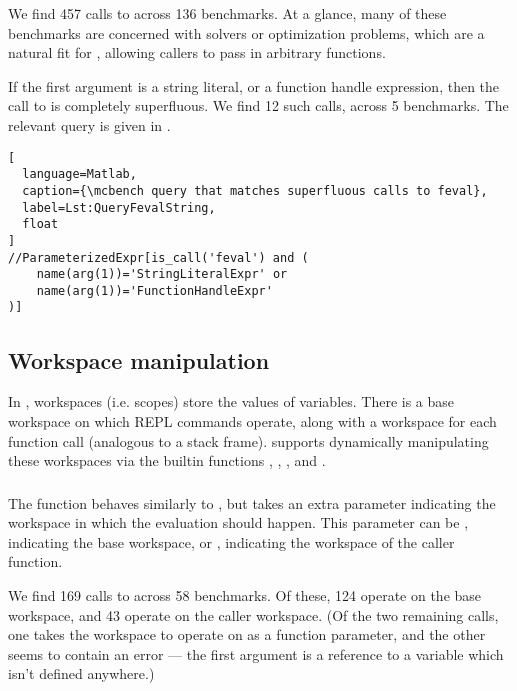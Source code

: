 We find 457 calls to  across 136 benchmarks. At a glance, many of
these benchmarks are concerned with solvers or optimization problems, which are
a natural fit for , allowing callers to pass in arbitrary
functions.

If the first argument is a string literal, or a function handle expression,
then the call to  is completely superfluous. We find 12 such calls,
across 5 benchmarks. The relevant query is given in
.

\begin{lstlisting}[
  language=Matlab,
  caption={\mcbench query that matches superfluous calls to feval},
  label=Lst:QueryFevalString,
  float
]
//ParameterizedExpr[is_call('feval') and (
    name(arg(1))='StringLiteralExpr' or
    name(arg(1))='FunctionHandleExpr'
)]
\end{lstlisting}

\subsection{Workspace manipulation}

In \matlab, workspaces (i.e. scopes) store the values of variables. There is a
base workspace on which REPL commands operate, along with a workspace for each
function call (analogous to a stack frame). \matlab supports dynamically
manipulating these workspaces via the builtin functions ,
, , and .

\subsubsection{}

The  function behaves similarly to , but takes an extra
parameter indicating the workspace in which the evaluation should happen. This
parameter can be , indicating the \matlab base workspace, or
, indicating the workspace of the caller function.

We find 169 calls to  across 58 benchmarks. Of these, 124 operate
on the base workspace, and 43 operate on the caller workspace. (Of the two
remaining calls, one takes the workspace to operate on as a function parameter,
and the other seems to contain an error --- the first argument is a reference
to a variable which isn't defined anywhere.)

